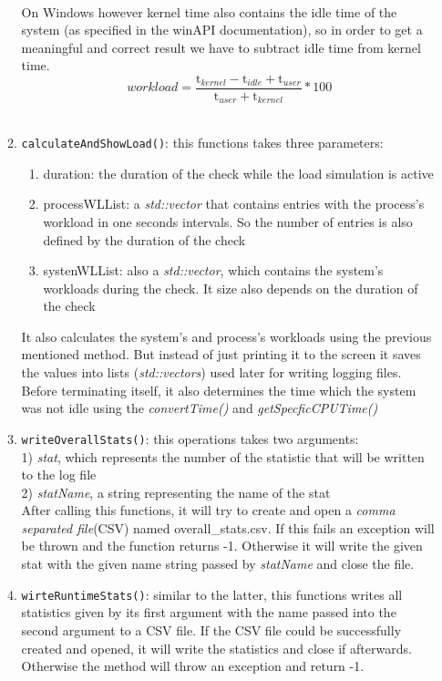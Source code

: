 \begin{enumerate}
\begin{enumerate}
\begin{equation}
		\end{equation}\\
		On Windows however kernel time also contains the idle time of the system (as specified in the winAPI documentation), so in order to get a meaningful and correct result we have to subtract idle time from kernel time.
		\begin{equation}
		workload =  \frac{\mathrm{t}_{kernel}-\mathrm{t}_{idle}+\mathrm{t}_{user}}{\mathrm{t}_{user}+\mathrm{t}_{kernel}}*100
		\end{equation}\\
		\item \texttt{calculateAndShowLoad()}: this functions takes three parameters:
		\begin{enumerate}
			\item duration: the duration of the check while the load simulation is active
			\item processWLList: a \textit{std::vector} that contains entries with the process's workload in one seconds intervals. So the number of entries is also defined by the duration of the check
			\item systenWLList: also a \textit{std::vector}, which contains the system's workloads during the check. It size also depends on the duration of the check 
		\end{enumerate}
		It also calculates the system's and process's workloads using the previous mentioned method. But instead of just printing it to the screen it saves the values into lists (\textit{std::vectors}) used later for writing logging files. Before terminating itself, it also determines the time which the system was not idle using the \textit{convertTime()} and \textit{getSpecficCPUTime()}
		\item \texttt{writeOverallStats()}: this operations takes two arguments:\\
		1) \textit{stat}, which represents the number of the statistic that will be written to the log file\\
		2) \textit{statName}, a string representing the name of the stat\\
		After calling this functions, it will try to create and open a \textit{comma separated file}(CSV) named \dq overall\_stats.csv\dq{}. If this fails an exception will be thrown and the function returns -1. Otherwise it will write the given stat with the given name string passed by \textit{statName} and close the file.
		\item \texttt{wirteRuntimeStats()}: similar to the latter, this functions writes all statistics given by its first argument with the name passed into the second argument to a CSV file. If the CSV file could be successfully created and opened, it will write the statistics and close if afterwards. Otherwise the method will throw an exception and return -1.
	\end{enumerate}
\end{enumerate}
\newpage
